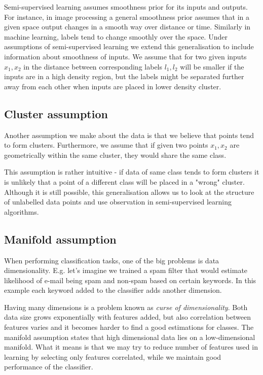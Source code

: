 \documentclass[12pt, a4paper, pdflatex]{report}
\begin{document}
Semi-supervised learning assumes smoothness prior for its inputs and outputs\cite{chapelle06}. For instance, in image processing a general smoothness prior assumes that in a given space output changes in a smooth way over distance or time\cite{stan95}. Similarly in machine learning, labels tend to change smoothly over the space. Under assumptions of semi-supervised learning we extend this generalisation to include information about smoothness of inputs. We assume that for two given inputs $ x_1, x_2 $ in the distance between corresponding labels $ l_1, l_2 $ will be smaller if the inputs are in a high density region, but the labels might be separated further away from each other when inputs are placed in lower density cluster.

\subsection{Cluster assumption}
\label{sec:clusterassump}

Another assumption we make about the data is that we believe that points tend to form clusters. Furthermore, we assume that if given two points $ x_1, x_2 $ are geometrically within the same cluster, they would share the same class\cite{chapelle06}.

This assumption is rather intuitive -  if data of same class tends to form clusters it is unlikely that a point of a different class will be placed in a "wrong" cluster. Although it is still possible, this generalisation allows us to look at the structure of unlabelled data points and use observation in semi-supervised learning algorithms.

\subsection{Manifold assumption}
 
When performing classification tasks, one of the big problems is data dimensionality. E.g. let's imagine we trained a spam filter that would estimate likelihood of e-mail being spam and non-spam based on certain keywords. In this example each keyword added to the classifier adds another dimension. 

Having many dimensions is a problem known as \textit{curse of dimensionality}\cite{chapelle06}. Both data size grows exponentially with features added, but also correlation between features varies and it becomes harder to find a good estimations for classes. The manifold assumption states that high dimensional data lies on a low-dimensional manifold. What it means is that we may try to reduce number of features used in learning by selecting only features correlated, while we maintain good performance of the classifier. 
\end{document}
